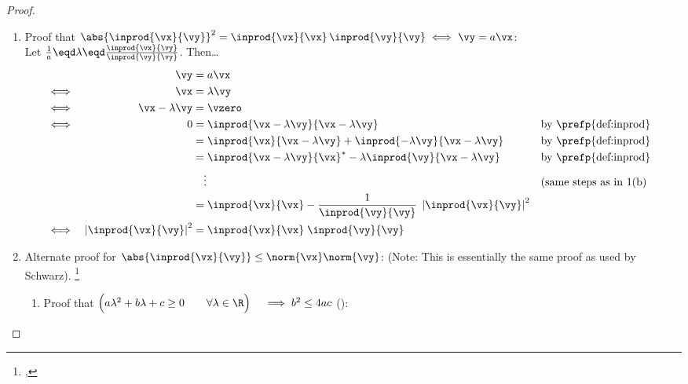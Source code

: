 \begin{proof}
\begin{enumerate}
  \item Proof that
      $\abs{\inprod{\vx}{\vy}}^2 = \inprod{\vx}{\vx}\, \inprod{\vy}{\vy}
       \iff
       \vy=a\vx
      $:\\
          Let $\frac{1}{a}\eqd\lambda\eqd\frac{\inprod{\vx}{\vy}}{\inprod{\vy}{\vy}}$. Then\ldots
      \begin{align*}
           &&
         \vy
           &= a\vx
         \\&\iff&
         \vx
           &= \lambda\vy
         \\&\iff&
         \vx-\lambda\vy
           &= \vzero
         \\&\iff&
         0
           &=   \inprod{\vx-\lambda\vy}{\vx-\lambda\vy}
           &&   \text{by \prefp{def:inprod}}
         \\&&&=   \inprod{\vx}{\vx-\lambda\vy}
            +   \inprod{-\lambda\vy}{\vx-\lambda\vy}
           &&   \text{by \prefp{def:inprod}}
         \\&&&=   \inprod{\vx-\lambda\vy}{\vx}^\ast
               -\lambda\inprod{\vy}{\vx-\lambda\vy}
           &&   \text{by \prefp{def:inprod}}
         \\&&&\quad\vdots
           &&   \text{(same steps as in 1(b)}
         \\&&&=   \inprod{\vx}{\vx}
            -   \frac{1}{\inprod{\vy}{\vy}}\; \left| \inprod{\vx}{\vy}\right|^2
         \\&\iff&
         \left|\inprod{\vx}{\vy}\right|^2
           &=   \inprod{\vx}{\vx} \; \inprod{\vy}{\vy}
      \end{align*}


\item Alternate proof for $\abs{\inprod{\vx}{\vy}} \le \norm{\vx}\norm{\vy}$:
      (Note: This is essentially the same proof as used by Schwarz).
      \footnote{
        ,
        }

  \begin{enumerate}

    \item Proof that
            $\Big(a\lambda^2+b\lambda+c\ge0\qquad\forall \lambda\in\R\Big) \quad\implies b^2\le4ac$
            (): 


\end{enumerate}
\end{enumerate}
\end{proof}
